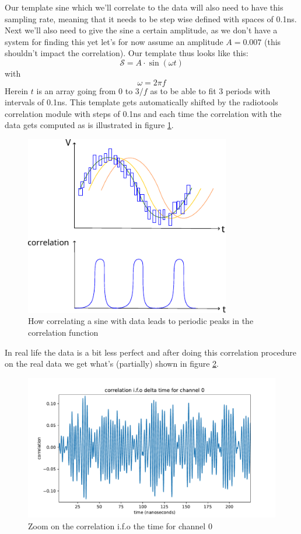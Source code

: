 Our template sine which we'll correlate to the data will also need to have this
sampling rate, meaning that it needs to be step wise defined with spaces of
0.1ns. Next we'll also need to give the sine a certain amplitude, as we don't
have a system for finding this yet let's for now assume an amplitude $A =
0.007$ (this shouldn't impact the correlation).  Our template thus looks like
this:
\begin{equation}
	\mathcal{S} = A\cdot\sin(\omega t) 
\end{equation}
with
\begin{equation}
	\omega = 2\pi f
\end{equation}
Herein $t$ is an array going from 0 to $3/f$ as to be able to fit 3 periods
with intervals of 0.1ns.  This template gets automatically shifted by the radiotools
correlation module with steps of 0.1ns and each time the correlation with the
data gets computed as is illustrated in figure \ref{fig:SineCorrFull}.
\begin{figure}
	\centering
	\includegraphics[width=0.8\textwidth]{figures/SineDataCorrFull.pdf}
	\caption{How correlating a sine with data leads to periodic peaks in the correlation function}
	\label{fig:SineCorrFull}
\end{figure}
In real life the data is a bit less perfect and after doing this correlation
procedure on the real data we get what's (partially) shown in figure
\ref{fig:CorrCh0}.
\begin{figure}
	\centering
	\includegraphics[width=\textwidth]{figures/CorrelationCh0.pdf}
	\caption{Zoom on the correlation i.f.o the time for channel 0}
	\label{fig:CorrCh0}
\end{figure}
